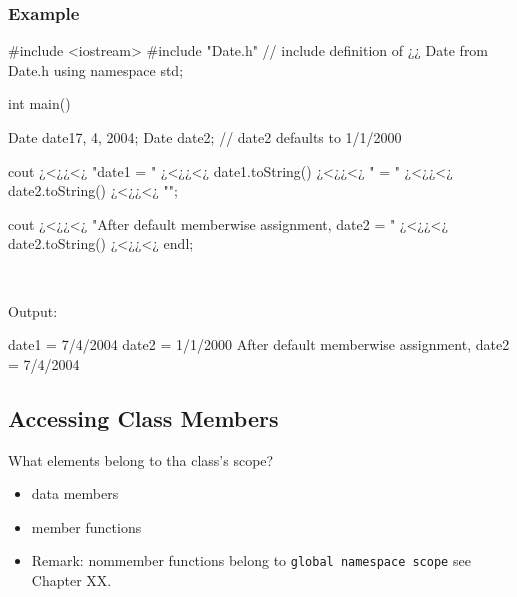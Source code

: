 \newpage
\subsubsection{Example}
\begin{minipage}{\MPWxLARGExLISTING\textwidth} %
{} %
\begin{CPPCode}
#include <iostream>
#include "Date.h" // include definition of ¿¿ Date from Date.h
using namespace std;

int main()
{
    Date date1{7, 4, 2004};
    Date date2; // date2 defaults to 1/1/2000
    
    cout ¿<¿¿<¿ "date1 = " ¿<¿¿<¿ date1.toString() ¿<¿¿<¿ " = " ¿<¿¿<¿ date2.toString() ¿<¿¿<¿ "\n\n";
    
    cout ¿<¿¿<¿ "After default memberwise assignment, date2 = " ¿<¿¿<¿ date2.toString() ¿<¿¿<¿ endl;
}
\end{CPPCode}
\end{minipage}\\

\noindent{}
\begin{minipage}{\MPWxLARGExLISTING\textwidth} %
{} %
Output:\\
\vspace{-0.5cm}
\begin{Terminal}
date1 = 7/4/2004
date2 = 1/1/2000
After default memberwise assignment, date2 = 7/4/2004
\end{Terminal}
\end{minipage}

\subsection{Accessing Class Members}
What elements belong to tha class's scope?
\begin{itemize}
    \item data members
    \item member functions
    \item Remark: nommember functions belong to \texttt{global namespace scope} see Chapter XX.
\end{itemize}




